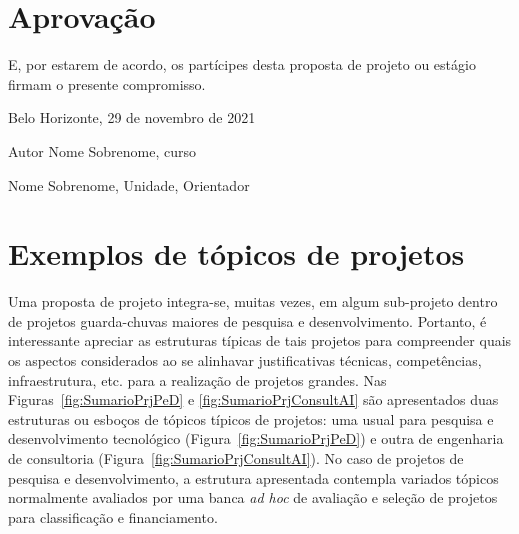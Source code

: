 \section{Aprovação}

E, por estarem de acordo, os partícipes desta proposta de projeto ou estágio firmam o presente compromisso.


Belo Horizonte, 29 de novembro de 2021  %

\begin{center}
	\vspace{1.5cm}
	
		Autor Nome Sobrenome, curso

\vspace{1.5cm}

			Nome Sobrenome, Unidade,  Orientador

\end{center}
 
  
\section{Exemplos de tópicos de projetos}    

Uma proposta de projeto integra-se, muitas vezes, em algum sub-projeto dentro de projetos guarda-chuvas maiores de pesquisa e desenvolvimento. Portanto, é interessante apreciar as estruturas típicas de tais projetos para compreender quais os aspectos considerados ao se alinhavar justificativas técnicas, competências, infraestrutura, etc. para a realização de projetos grandes. Nas Figuras~\ref{fig:SumarioPrjPeD}  e \ref{fig:SumarioPrjConsultAI} são apresentados duas estruturas ou esboços de tópicos típicos de projetos: uma usual para pesquisa e desenvolvimento tecnológico (Figura~\ref{fig:SumarioPrjPeD}) e outra de engenharia de consultoria (Figura~\ref{fig:SumarioPrjConsultAI}).  No caso de projetos de pesquisa e desenvolvimento, a estrutura apresentada contempla variados tópicos normalmente avaliados por uma banca \emph{ad hoc} de avaliação e seleção de projetos para classificação e financiamento.

